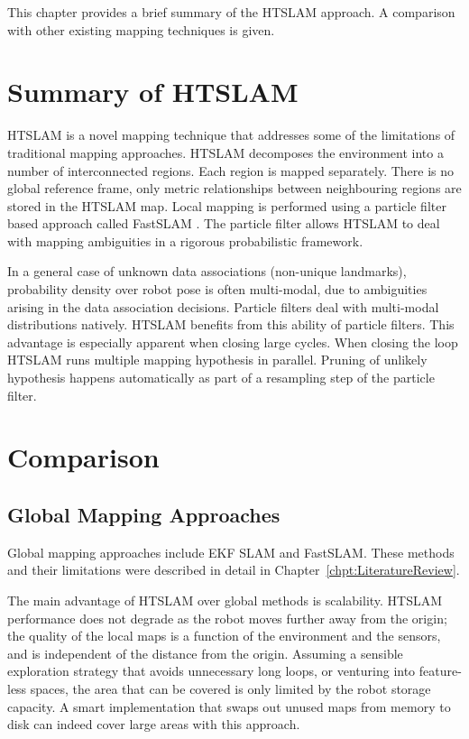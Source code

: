 This chapter provides a brief summary of the HTSLAM approach. A comparison
with other existing mapping techniques is given. 


\section{Summary of HTSLAM}


HTSLAM is a novel mapping technique that addresses some of the
limitations of traditional mapping approaches. HTSLAM decomposes the
environment into a number of interconnected regions. Each region is
mapped separately. There is no global reference frame, only
metric relationships between neighbouring regions are stored in the
HTSLAM map. Local mapping is performed using a particle filter based
approach called FastSLAM \cite{fastslam, fastslam2}. The particle filter
allows HTSLAM to deal with mapping ambiguities in a rigorous
probabilistic framework.


In a general case of unknown data associations (non-unique landmarks),
probability density over robot pose is often multi-modal, due to
ambiguities arising in the data association decisions. Particle filters
deal with multi-modal distributions natively. HTSLAM benefits from this
ability of particle filters. This advantage is especially apparent when
closing large cycles. When closing the loop HTSLAM runs multiple mapping
hypothesis in parallel. Pruning of unlikely hypothesis happens
automatically as part of a resampling step of the particle filter.



\section{Comparison}

\subsection{Global Mapping Approaches}

Global mapping approaches include EKF SLAM and FastSLAM. These methods
and their limitations were described in detail in
Chapter~\ref{chpt:LiteratureReview}.

The main advantage of HTSLAM over global methods is scalability. HTSLAM
performance does not degrade as the robot moves further away from the
origin; the quality of the local maps is a function of the environment
and the sensors, and is independent of the distance from the
origin. Assuming a sensible exploration strategy that avoids unnecessary
long loops, or venturing into feature-less spaces, the area that can be
covered is only limited by the robot storage capacity. A smart
implementation that swaps out unused maps from memory to disk can indeed
cover large areas with this approach.

